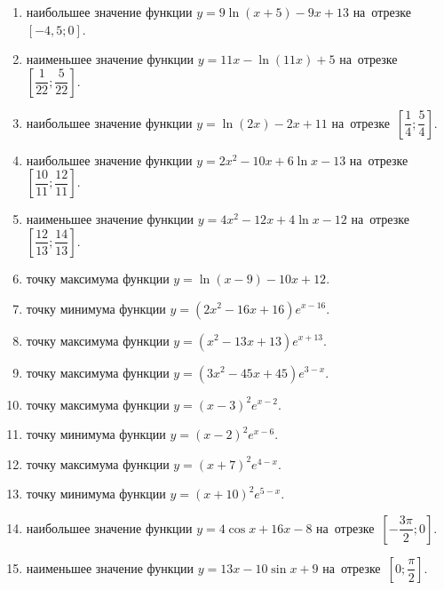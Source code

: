 \documentclass[a4paper,10pt]{article}
\begin{document}
\begin{enumerate}
\item {} наибольшее значение функции $y=9\ln \left(x+5\right)-9x+13$ на~отрезке~$\left[-4,5;0\right]$.

\item {} наименьшее значение функции $y=11x-\ln \left(11x\right)+5$ на~отрезке~$\left[\dfrac{1}{22};\dfrac{5}{22}\right]$.

\item {} наибольшее значение функции $y=\ln \left(2x\right)-2x+11$ на~отрезке~$\left[\dfrac{1}{4};\dfrac{5}{4}\right]$.

\item {} наибольшее значение функции $y=2x^2-10x+6\ln x-13$ на~отрезке~$\left[\dfrac{10}{11};\dfrac{12}{11}\right]$.

\item {} наименьшее значение функции $y=4x^2-12x+4\ln x-12$ на~отрезке~$\left[\dfrac{12}{13};\dfrac{14}{13}\right]$.

\item {} точку максимума функции $y=\ln \left(x-9\right)-10x+12$.

\item {} точку минимума функции $y=\left(2x^2-16x+16\right)e^{x-16}$.

\item {} точку максимума функции $y=\left(x^2-13x+13\right)e^{x+13}$.

\item {} точку максимума функции $y=\left(3x^2-45x+45\right)e^{3-x}$.

\item {} точку максимума функции $y=\left(x-3\right)^2e^{x-2}$.

\item {} точку минимума функции $y=\left(x-2\right)^2e^{x-6}$.

\item {} точку максимума функции $y=\left(x+7\right)^2e^{4-x}$.

\item {} точку минимума функции $y=\left(x+10\right)^2e^{5-x}$.

\item {} наибольшее значение функции $y=4\cos x+16x-8$ на~отрезке~$\left[-\dfrac{3\pi }{2};0\right]$.

\item {} наименьшее значение функции $y=13x-10\sin x+9$ на~отрезке~$\left[0;\dfrac{\pi }{2}\right]$.


\end{enumerate}
\end{document}
